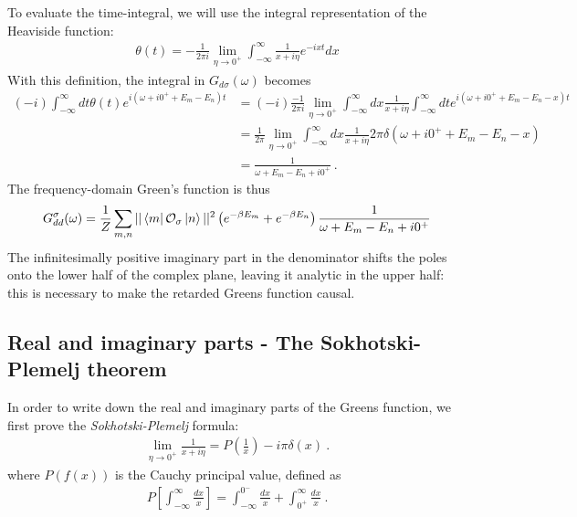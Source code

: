 To evaluate the time-integral, we will use the integral representation of the Heaviside function:
\begin{equation}\begin{aligned}
	\theta(t) = -\frac{1}{2\pi i}\lim_{\eta \to 0^+} \int_{-\infty}^\infty \frac{1}{x + i\eta}e^{-ixt}dx
\end{aligned}\end{equation}
With this definition, the integral in \(G_{d\sigma}(\omega)\) becomes
\begin{equation}\begin{aligned}
	\left(-i\right)\int_{-\infty}^\infty dt \theta(t)e^{i\left( \omega + i0^+ + E_m - E_n \right)t} &= \left(-i\right)\frac{-1}{2\pi i}\lim_{\eta \to 0^+} \int_{-\infty}^\infty dx\frac{1}{x+ i\eta}\int_{-\infty}^\infty dt e^{i\left( \omega + i0^+ + E_m - E_n - x\right)t} \\
									     &=\frac{1}{2\pi}\lim_{\eta \to 0^+} \int_{-\infty}^\infty dx\frac{1}{x+ i\eta} 2\pi \delta\left( \omega + i0^+ + E_m - E_n - x\right) \\
									     &=\frac{1}{\omega + E_m - E_n + i0^+}~.
\end{aligned}\end{equation}
The frequency-domain Green's function is thus~\cite{bruus2004}
\begin{equation}\begin{aligned}
	G_{d d}^\sigma(\omega) = \frac{1}{Z}\sum_{m,n}||\bra{m}\mathcal{O}_{\sigma}\ket{n}||^2\left( e^{-\beta E_m} + e^{-\beta E_n}\right)\frac{1}{\omega + E_m - E_n + i0^+}
\end{aligned}\end{equation}
The infinitesimally positive imaginary part in the denominator shifts the poles onto the lower half of the complex plane, leaving it analytic in the upper half: this is necessary to make the retarded Greens function causal.

\subsection{Real and imaginary parts - The Sokhotski-Plemelj theorem}
In order to write down the real and imaginary parts of the Greens function, we first prove the {\it Sokhotski-Plemelj} formula:
\begin{equation}\begin{aligned}\label{SokhotskiPlemelj}
	\lim_{\eta \to 0^+} \frac{1}{x + i \eta} = P\left(\frac{1}{x}\right) - i \pi \delta(x)~.
\end{aligned}\end{equation}
where \(P(f(x))\) is the Cauchy principal value, defined as 
\begin{equation}\begin{aligned}
	P\left[\int_{-\infty}^{\infty}\frac{dx}{x}\right] = \int_{-\infty}^{0^-}\frac{dx}{x} + \int_{0^+}^{\infty}\frac{dx}{x}~.
\end{aligned}\end{equation}

